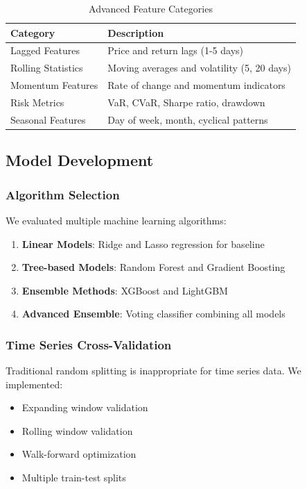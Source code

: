 \documentclass[12pt,a4paper]{article}
\begin{document}
\begin{table}[H]
\centering
\caption{Advanced Feature Categories}
\label{tab:advanced_features}
\begin{tabular}{@{}ll@{}}
\toprule
Category & Description \\
\midrule
Lagged Features & Price and return lags (1-5 days) \\
Rolling Statistics & Moving averages and volatility (5, 20 days) \\
Momentum Features & Rate of change and momentum indicators \\
Risk Metrics & VaR, CVaR, Sharpe ratio, drawdown \\
Seasonal Features & Day of week, month, cyclical patterns \\
\bottomrule
\end{tabular}
\end{table}

\subsection{Model Development}

\subsubsection{Algorithm Selection}
We evaluated multiple machine learning algorithms:

\begin{enumerate}
    \item \textbf{Linear Models}: Ridge and Lasso regression for baseline
    \item \textbf{Tree-based Models}: Random Forest and Gradient Boosting
    \item \textbf{Ensemble Methods}: XGBoost and LightGBM
    \item \textbf{Advanced Ensemble}: Voting classifier combining all models
\end{enumerate}

\subsubsection{Time Series Cross-Validation}
Traditional random splitting is inappropriate for time series data. We implemented:

\begin{itemize}
    \item Expanding window validation
    \item Rolling window validation
    \item Walk-forward optimization
    \item Multiple train-test splits
\end{itemize}
\end{document}
